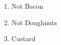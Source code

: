 \documentclass{article}
\begin{document}
\begin{enumerate}
    \item Not Bacon
    \item Not Doughnuts
    \item Custard
\end{enumerate}
\end{document}

